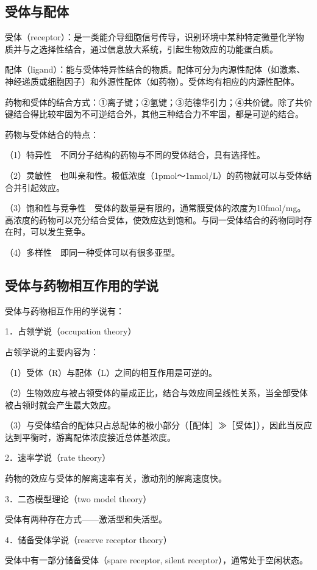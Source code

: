 \subsection{受体与配体}

受体（receptor）：是一类能介导细胞信号传导，识别环境中某种特定微量化学物质并与之选择性结合，通过信息放大系统，引起生物效应的功能蛋白质。

配体（ligand）：能与受体特异性结合的物质。配体可分为内源性配体（如激素、神经递质或细胞因子）和外源性配体（如药物）。受体均有相应的内源性配体。

药物和受体的结合方式：①离子键；②氢键；③范德华引力；④共价键。除了共价键结合得比较牢固为不可逆结合外，其他三种结合力不牢固，都是可逆的结合。

药物与受体结合的特点：

（1）特异性　不同分子结构的药物与不同的受体结合，具有选择性。

（2）灵敏性　也叫亲和性。极低浓度（1pmol～1nmol/L）的药物就可以与受体结合并引起效应。

（3）饱和性与竞争性　受体的数量是有限的，通常膜受体的浓度为10fmol/mg。高浓度的药物可以充分结合受体，使效应达到饱和。与同一受体结合的药物同时存在时，可以发生竞争。

（4）多样性　即同一种受体可以有很多亚型。

\subsection{受体与药物相互作用的学说}

受体与药物相互作用的学说有：

1．占领学说（occupation theory）

占领学说的主要内容为：

（1）受体（R）与配体（L）之间的相互作用是可逆的。

（2）生物效应与被占领受体的量成正比，结合与效应间呈线性关系，当全部受体被占领时就会产生最大效应。

（3）与受体结合的配体只占总配体的极小部分（［配体］≫［受体］），因此当反应达到平衡时，游离配体浓度接近总体基浓度。

2．速率学说（rate theory）

药物的效应与受体的解离速率有关，激动剂的解离速度快。

3．二态模型理论（two model theory）

受体有两种存在方式------激活型和失活型。

4．储备受体学说（reserve receptor theory）

受体中有一部分储备受体（spare receptor, silent
receptor），通常处于空闲状态。

